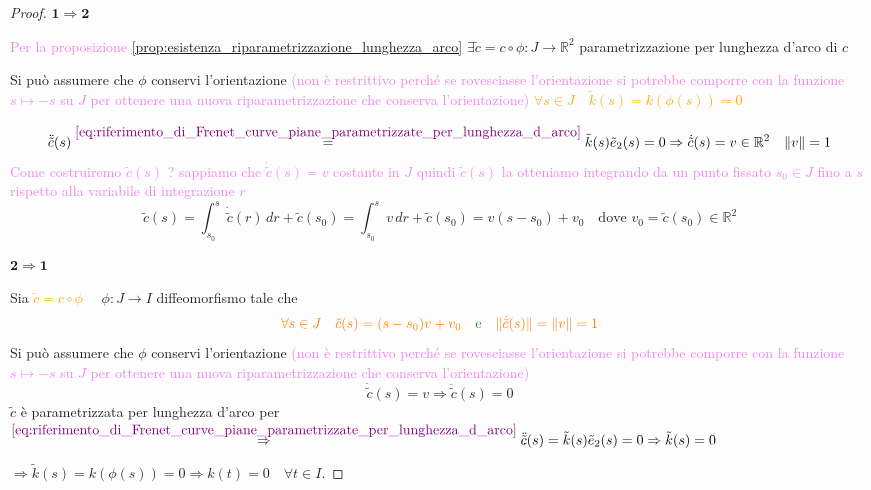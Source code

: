         \begin{proof}
        \mbox{}

        $\mathbf{1 \Rightarrow 2}$ 

        \textcolor{violet}{Per la proposizione \ref{prop:esistenza_riparametrizzazione_lunghezza_arco}} $\exists \tilde{c}=c \circ \phi: J \to \mathbb{R}^2$ parametrizzazione per lunghezza d'arco di $c$  

        Si può assumere che $\phi$ conservi l'orientazione \textcolor{violet}{(non è restrittivo perché se rovesciasse l'orientazione si potrebbe comporre 
        con la funzione $s \mapsto -s$ su $J$ per ottenere una nuova riparametrizzazione che conserva l'orientazione)} \textcolor{orange}{$\forall s \in J \quad \tilde{k}(s)=k \left(\phi(s)\right)=0$}

        \[ \ddot{\tilde{c}}(s) \overset{\textcolor{violet}{\eqref{eq:riferimento_di_Frenet_curve_piane_parametrizzate_per_lunghezza_d_arco}}}{=} \tilde{k}(s) \tilde{e}_2(s) = 0 \Rightarrow \dot{\tilde{c}}(s)=v \in \mathbb{R}^2 \quad \lVert v\rVert=1 \]
        \textcolor{violet}{Come costruiremo $\tilde{c}(s)$ ? sappiamo che $\dot{\tilde{c}}(s) = v$ costante in $J$ quindi $\tilde{c}(s)$ la otteniamo integrando 
        da un punto fissato $s_0 \in J $ fino a $s$ rispetto alla variabile di integrazione $r$}
        \[ \tilde{c}(s) = \int_{s_0}^s \dot{\tilde{c}}(r) \, dr + \tilde{c}(s_0) = \int_{s_0}^s v \, dr + \tilde{c}(s_0) = v(s-s_0) + v_0 \quad \text{dove } v_0 = \tilde{c}(s_0) \in \mathbb{R}^2 \]

        $\mathbf{2 \Rightarrow 1}$ 
        
        Sia \textcolor{orange}{$\tilde{c}= c \circ \phi$} $\quad \phi \colon J \to I$ diffeomorfismo tale che 
        \[ \color{orange} \forall s \in J \quad \tilde{c}(s) = (s-s_0)v + v_0 \quad \textcolor{verde}{\text{e}} \quad \norm{\dot{\tilde{c}}(s)} = \norm{v} = 1 \] 
        Si può assumere che $\phi$ conservi l'orientazione \textcolor{violet}{(non è restrittivo perché se rovesciasse l'orientazione si potrebbe comporre 
        con la funzione $s \mapsto -s$ su $J$ per ottenere una nuova riparametrizzazione che conserva l'orientazione)}
        \[ \dot{\tilde{c}}(s) = v \Rightarrow \ddot{\tilde{c}}(s) = 0 \]
        $\tilde{c}$ è parametrizzata per lunghezza d'arco per 
        $\overset{\textcolor{violet}{\eqref{eq:riferimento_di_Frenet_curve_piane_parametrizzate_per_lunghezza_d_arco}}}{\Rightarrow} \ddot{\tilde{c}}(s) = \tilde{k}(s) \tilde{e}_2(s) =0 \Rightarrow \tilde{k}(s) = 0$
        
        $\Rightarrow \tilde{k}(s) = k (\phi(s)) = 0 \Rightarrow k(t) = 0 \quad \forall t \in I$.
        \end{proof}
